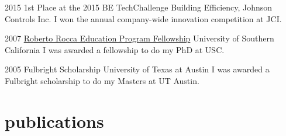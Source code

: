 \documentclass[]{../friggeri-cv} %
\begin{document}
\begin{entrylist}


\entry
{2015}
{1st Place at the 2015 BE TechChallenge}
{Building Efficiency, Johnson Controls Inc.}
{I won the annual company-wide innovation competition at JCI.}

\entry
{2007}
{\href{http://www.robertorocca.org/en/fellowships/fellows07.aspx}{Roberto Rocca Education Program Fellowship}}
{University of Southern California}
{I was awarded a fellowship to do my PhD at USC.}

\entry
{2005}
{Fulbright Scholarship}
{University of Texas at Austin}
{I was awarded a Fulbright scholarship to do my Masters at UT Austin.}


\end{entrylist}





\section{publications}




\end{document}
